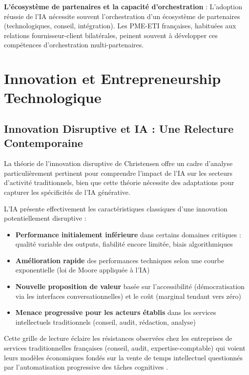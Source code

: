 \textbf{L'écosystème de partenaires et la capacité d'orchestration} : L'adoption réussie de l'IA nécessite souvent l'orchestration d'un écosystème de partenaires (technologiques, conseil, intégration). Les PME-ETI françaises, habituées aux relations fournisseur-client bilatérales, peinent souvent à développer ces compétences d'orchestration multi-partenaires.

\section{Innovation et Entrepreneurship Technologique}

\subsection{Innovation Disruptive et IA : Une Relecture Contemporaine}

La théorie de l'innovation disruptive de Christensen \cite{christensen1997innovator} offre un cadre d'analyse particulièrement pertinent pour comprendre l'impact de l'IA sur les secteurs d'activité traditionnels, bien que cette théorie nécessite des adaptations pour capturer les spécificités de l'IA générative.

L'IA présente effectivement les caractéristiques classiques d'une innovation potentiellement disruptive :

\begin{itemize}
    \item \textbf{Performance initialement inférieure} dans certains domaines critiques : qualité variable des outputs, fiabilité encore limitée, biais algorithmiques
    \item \textbf{Amélioration rapide} des performances techniques selon une courbe exponentielle (loi de Moore appliquée à l'IA)
    \item \textbf{Nouvelle proposition de valeur} basée sur l'accessibilité (démocratisation via les interfaces conversationnelles) et le coût (marginal tendant vers zéro)
    \item \textbf{Menace progressive pour les acteurs établis} dans les services intellectuels traditionnels (conseil, audit, rédaction, analyse)
\end{itemize}

Cette grille de lecture éclaire les résistances observées chez les entreprises de services traditionnelles françaises (conseil, audit, expertise-comptable) qui voient leurs modèles économiques fondés sur la vente de temps intellectuel questionnés par l'automatisation progressive des tâches cognitives \cite{syntec2024ai}.

